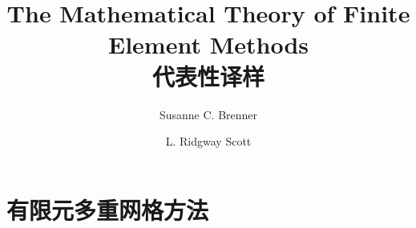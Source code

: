 \documentclass[a4paper,UTF8,12pt]{ctexart}
\title{The Mathematical Theory of Finite Element Methods\\代表性译样}
\author{Susanne C. Brenner \and L. Ridgway Scott}
\date{}
\begin{document}
\maketitle

\setcounter{section}{5}
\section{有限元多重网格方法}
\setcounter{subsection}{2}
\setcounter{thmcount}{0}
\setcounter{equation}{1}
\setcounter{figure}{0}
\renewcommand{\thethmcount}{\thesubsection.\arabic{thmcount}}
\renewcommand{\theequation}{\thesubsection.\arabic{equation}}
\renewcommand{\thefigure}{\thesection.\arabic{figure}}


\end{document}
